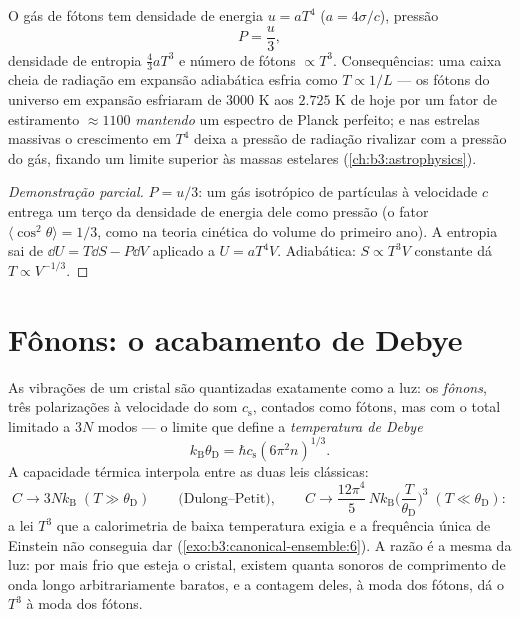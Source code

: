 \begin{proposition}\label{prop:b3:photons-phonons:thermo}
O gás de fótons tem densidade de energia $u = aT^4$ ($a =
4\sigma/c$), pressão
\[
P = \frac u3 ,
\]
densidade de entropia $\tfrac43 aT^3$ e número de fótons $\propto T^3$.
Consequências: uma caixa cheia de radiação em expansão adiabática
esfria como $T \propto 1/L$ --- os fótons do universo em expansão
esfriaram de $3000$ K aos $2.725$ K de hoje por um fator de estiramento
$\approx1100$ \emph{mantendo} um espectro de Planck perfeito; e
nas estrelas massivas o crescimento em $T^4$ deixa a pressão de radiação
rivalizar com a pressão do gás, fixando um limite superior às massas
estelares (\cref{ch:b3:astrophysics}).
\end{proposition}

\begin{proof}[Demonstração parcial]
$P = u/3$: um gás isotrópico de partículas à velocidade $c$ entrega
um terço da densidade de energia dele como pressão (o fator $\langle
\cos^2\theta\rangle = 1/3$, como na teoria cinética do volume do
primeiro ano). A entropia sai de $\dd U = T\dd S - P\dd V$ aplicado a $U =
aT^4V$. Adiabática: $S \propto T^3V$ constante dá $T \propto
V^{-1/3}$.
\end{proof}

\section{Fônons: o acabamento de Debye}

\begin{theorem}\label{thm:b3:photons-phonons:debye}
As vibrações de um cristal são  quantizadas exatamente
como a luz: os \emph{fônons}, três polarizações à velocidade do som
$c_{\text{s}}$, contados como fótons, mas com o total limitado a
$3N$ modos --- o limite que define a \emph{temperatura de Debye}
\[
k_{\text{B}}\theta_{\text{D}} = \hbar c_{\text{s}}
(6\pi^2n)^{1/3} .
\]
A capacidade térmica interpola entre as duas leis clássicas:
\[
C \to 3Nk_{\text{B}} \;(T \gg \theta_{\text{D}})
\qquad\text{(Dulong--Petit)} ,
\qquad
C \to \frac{12\pi^4}{5}\,Nk_{\text{B}}
\Big(\frac{T}{\theta_{\text{D}}}\Big)^3
\;(T \ll \theta_{\text{D}}) :
\]
a lei $T^3$ que a calorimetria de baixa temperatura exigia e
a frequência única de Einstein não conseguia dar
(\cref{exo:b3:canonical-ensemble:6}). A razão é a mesma
da luz: por mais frio que esteja o cristal, existem quanta sonoros de
comprimento de onda longo arbitrariamente baratos, e a contagem deles,
à moda dos fótons, dá o $T^3$ à moda dos fótons.
\end{theorem}

